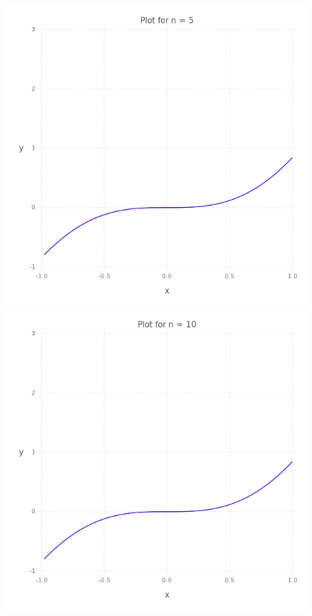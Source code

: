 \begin{figure}
    \begin{multicols}{2}
        \includegraphics[width=\linewidth]{../task-5/plots/myplot-x2sinx-5.png}\par 
        \includegraphics[width=\linewidth]{../task-5/plots/myplot-x2sinx-10.png}\par           

\end{multicols}
\end{figure}
